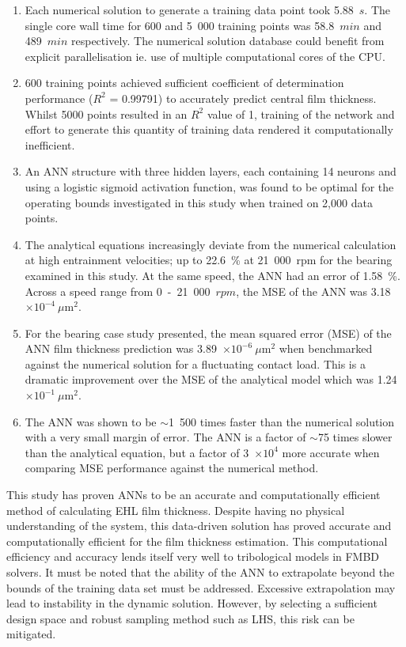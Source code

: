 \begin{enumerate}
	\item Each numerical solution to generate a training data point took 5.88~$s$. The single core wall time for 600 and 5~000 training points was 58.8~$min$ and 489~$min$ respectively. The numerical solution database could benefit from explicit parallelisation ie. use of multiple computational cores of the CPU. 
	\item 600 training points achieved sufficient coefficient of determination performance ($R^2$ = 0.99791) to accurately predict central film thickness. Whilst 5000 points resulted in an $R^2$ value of 1, training of the network and effort to generate this quantity of training data rendered it computationally inefficient.
	\item An ANN structure with three hidden layers, each containing 14 neurons and using a logistic sigmoid activation function, was found to be optimal for the operating bounds investigated in this study when trained on 2,000 data points.
	\item The analytical equations increasingly deviate from the numerical calculation at high entrainment velocities; up to 22.6~\% at 21~000~rpm for the bearing examined in this study. At the same speed, the ANN had an error of 1.58~\%. Across a speed range from 0~-~21~000~$rpm$, the MSE of the ANN was 3.18~$\times 10^{-4}~\mu \mathrm{m}^2$.
	\item For the bearing case study presented, the mean squared error (MSE) of the ANN film thickness prediction was 3.89~$\times 10^{-6}~\mu \mathrm{m}^2$ when benchmarked against the numerical solution for a fluctuating contact load. This is a dramatic improvement over the MSE of the analytical model which was 1.24~$\times 10^{-1}~\mu\mathrm{m}^2$.
	\item The ANN was shown to be $\sim$1~500 times faster than the numerical solution with a very small margin of error. The ANN is a factor of $\sim$75 times slower than the analytical equation, but a factor of 3~$\times 10^{4}$ more accurate when comparing MSE performance against the numerical method.
\end{enumerate}

This study has proven ANNs to be an accurate and computationally efficient method of calculating EHL film thickness. Despite having no physical understanding of the system, this data-driven solution has proved accurate and computationally efficient for the film thickness estimation. This computational efficiency and accuracy lends itself very well to tribological models in FMBD solvers. It must be noted that the ability of the ANN to extrapolate beyond the bounds of the training data set must be addressed. Excessive extrapolation may lead to instability in the dynamic solution. However, by selecting a sufficient design space and robust sampling method such as LHS, this risk can be mitigated.

